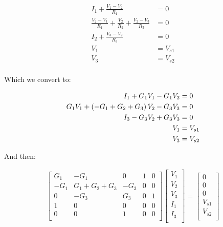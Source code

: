 \begin{equation} \label{lattice5}
\begin{split}
I_1 + \frac{V_1 - V_2}{R_1} &= 0 \\
\frac{V_2 - V_1}{R_1} + \frac{V_2}{R_2} + \frac{V_2 - V_3}{R_3} &= 0 \\ 
I_2 + \frac{V_3 - V_2}{R_3} &= 0 \\
V_1 & = V_{s1} \\
V_3 & = V_{s2} \\
\end{split}
\end{equation}

Which we convert to: 

\begin{equation} \label{lattice6}
\begin{split}
I_1 + G_1V_1 - G_1V_2 &= 0 \\
G_1V_1 + \left(-G_1 + G_2 + G_3\right)V_2 - G_3V_3 &= 0 \\ 
I_3 - G_3V_2 + G_3V_3 &= 0 \\
V_1 & = V_{s1} \\
V_3 & = V_{s2} \\
\end{split}
\end{equation}

And then: 

\begin{align}
\begin{bmatrix} 
G_1 &   -G_1 &  0   & 1     &   0    \\
-G_1 &   G_1 + G_2 + G_3 &  -G_3   & 0     &   0    \\
0 &   -G_3 &  G_3   & 0     &   1    \\
1 &   0 &  0   & 0     &   0    \\
0 &   0 &  1   & 0     &   0    \\
\end{bmatrix}
\begin{bmatrix} 
V_1      \\
V_2      \\
V_3      \\
I_1      \\
I_3      \\
\end{bmatrix}
= 
\begin{bmatrix} 
0     \\
0      \\
0     \\
V_{s1}      \\
V_{s2}     \\
\end{bmatrix}
\end{align}


